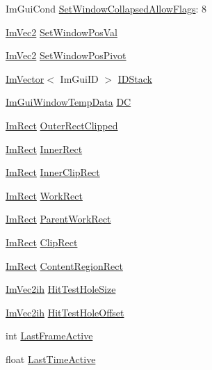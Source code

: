 \begin{DoxyCompactItemize}
\item 
Im\+Gui\+Cond \hyperlink{structImGuiWindow_a48384a3767252325e5c71b534adc58a9}{Set\+Window\+Collapsed\+Allow\+Flags}\+: 8
\item 
\hyperlink{structImVec2}{Im\+Vec2} \hyperlink{structImGuiWindow_a6caed47ef8e25a2e7a68a6be72c5716a}{Set\+Window\+Pos\+Val}
\item 
\hyperlink{structImVec2}{Im\+Vec2} \hyperlink{structImGuiWindow_a4de5608bf44728447327d832fa84f0c9}{Set\+Window\+Pos\+Pivot}
\item 
\hyperlink{structImVector}{Im\+Vector}$<$ Im\+Gui\+ID $>$ \hyperlink{structImGuiWindow_a1a71724c43e37830ed9b38bd34f26917}{I\+D\+Stack}
\item 
\hyperlink{structImGuiWindowTempData}{Im\+Gui\+Window\+Temp\+Data} \hyperlink{structImGuiWindow_a77e144869bf4ec6565893d9f7b7283eb}{DC}
\item 
\hyperlink{structImRect}{Im\+Rect} \hyperlink{structImGuiWindow_ac3f0ac7cf4d8edb14a8e920e6831b4d8}{Outer\+Rect\+Clipped}
\item 
\hyperlink{structImRect}{Im\+Rect} \hyperlink{structImGuiWindow_a0fd27908ebffb5d9509dc9e7f199d67d}{Inner\+Rect}
\item 
\hyperlink{structImRect}{Im\+Rect} \hyperlink{structImGuiWindow_a5986bee1c08ff742a14c57e99ce6e7c8}{Inner\+Clip\+Rect}
\item 
\hyperlink{structImRect}{Im\+Rect} \hyperlink{structImGuiWindow_a3de436c30b33dac061c09e4334beaa3b}{Work\+Rect}
\item 
\hyperlink{structImRect}{Im\+Rect} \hyperlink{structImGuiWindow_add72d18277b43939929463c062c8975b}{Parent\+Work\+Rect}
\item 
\hyperlink{structImRect}{Im\+Rect} \hyperlink{structImGuiWindow_a9950a40b18de2579c4d3deb0ab33f455}{Clip\+Rect}
\item 
\hyperlink{structImRect}{Im\+Rect} \hyperlink{structImGuiWindow_ae6a48d6e48a4bf5e35fe60e765e17c68}{Content\+Region\+Rect}
\item 
\hyperlink{structImVec2ih}{Im\+Vec2ih} \hyperlink{structImGuiWindow_aad97a90bf66307eaf3d9ad4a5697285d}{Hit\+Test\+Hole\+Size}
\item 
\hyperlink{structImVec2ih}{Im\+Vec2ih} \hyperlink{structImGuiWindow_a656437e7e87dd567069579fb813d6e91}{Hit\+Test\+Hole\+Offset}
\item 
int \hyperlink{structImGuiWindow_a6f3c194efabb4fd0a99be45fa5fe26f1}{Last\+Frame\+Active}
\item 
float \hyperlink{structImGuiWindow_aeb00ca206e69f5ffa373a0bf42ebf2ef}{Last\+Time\+Active}

\end{DoxyCompactItemize}
